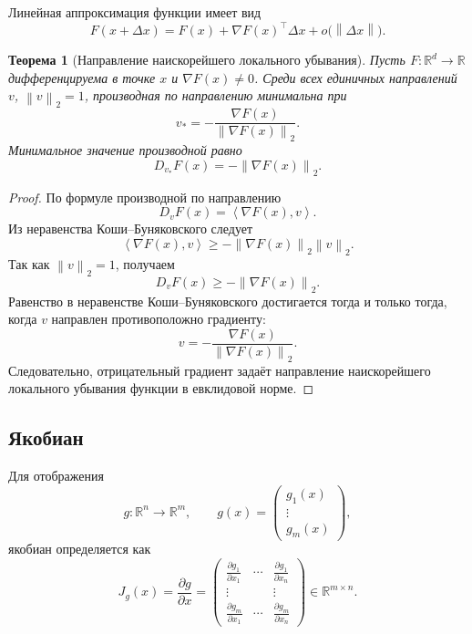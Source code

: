 \documentclass[12pt,a4paper]{article}
\theoremstyle{plain}
\newtheorem{theorem}{Теорема}[section]
\theoremstyle{definition}
\theoremstyle{remark}
\newcommand{\R}{\mathbb{R}}
\newcommand{\norm}[1]{\left\lVert #1 \right\rVert}
\newcommand{\inner}[2]{\left\langle #1,#2 \right\rangle}
\begin{document}
Линейная аппроксимация функции имеет вид
\[
    F(x+\Delta x)
    =
    F(x)
    +
    \nabla F(x)^\top\Delta x
    +
    o\bigl(\norm{\Delta x}\bigr).
\]

\begin{theorem}[Направление наискорейшего локального убывания]
Пусть $F\colon\R^d\to\R$ дифференцируема в точке $x$ и
$\nabla F(x)\neq 0$. Среди всех единичных направлений
$v$, $\norm{v}_2=1$, производная по направлению минимальна при
\[
    v_*
    =
    -\frac{\nabla F(x)}{\norm{\nabla F(x)}_2}.
\]
Минимальное значение производной равно
\[
    D_{v_*}F(x)
    =
    -\norm{\nabla F(x)}_2.
\]
\end{theorem}

\begin{proof}
По формуле производной по направлению
\[
    D_vF(x)
    =
    \inner{\nabla F(x)}{v}.
\]
Из неравенства Коши--Буняковского следует
\[
    \inner{\nabla F(x)}{v}
    \geq
    -\norm{\nabla F(x)}_2\norm{v}_2.
\]
Так как $\norm{v}_2=1$, получаем
\[
    D_vF(x)
    \geq
    -\norm{\nabla F(x)}_2.
\]
Равенство в неравенстве Коши--Буняковского достигается тогда и
только тогда, когда $v$ направлен противоположно градиенту:
\[
    v
    =
    -\frac{\nabla F(x)}
    {\norm{\nabla F(x)}_2}.
\]
Следовательно, отрицательный градиент задаёт направление
наискорейшего локального убывания функции в евклидовой норме.
\end{proof}

\subsection{Якобиан}

Для отображения
\[
    g\colon\R^n\to\R^m,
    \qquad
    g(x)
    =
    \begin{pmatrix}
        g_1(x)\\
        \vdots\\
        g_m(x)
    \end{pmatrix},
\]
якобиан определяется как
\[
    J_g(x)
    =
    \frac{\partial g}{\partial x}
    =
    \begin{pmatrix}
        \frac{\partial g_1}{\partial x_1}
        &\cdots&
        \frac{\partial g_1}{\partial x_n}\\
        \vdots&&\vdots\\
        \frac{\partial g_m}{\partial x_1}
        &\cdots&
        \frac{\partial g_m}{\partial x_n}
    \end{pmatrix}
    \in\R^{m\times n}.
\]
\end{document}
